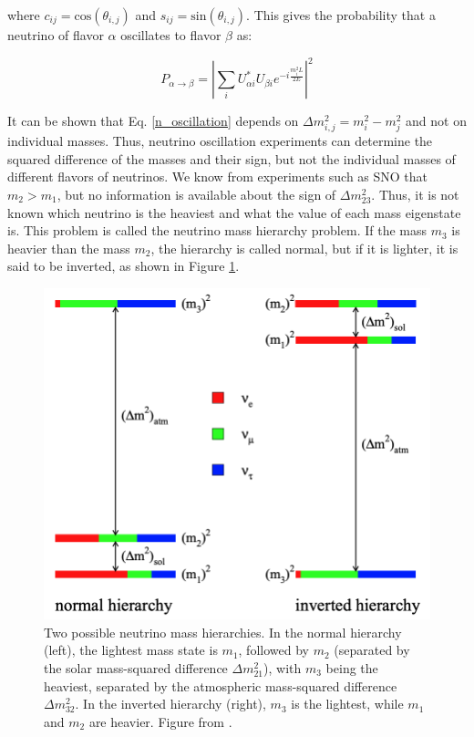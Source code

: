 where $c_{ij}=\mathrm{cos}(\theta_{i,j})$ and $s_{ij}=\mathrm{sin}(\theta_{i,j})$. This gives the probability that a neutrino of flavor $\alpha$ oscillates to flavor $\beta$ as:

\begin{equation}\label{n_oscillation}
P_{\alpha\rightarrow\beta} = \left|\sum_i U^*_{\alpha i}U_{\beta i} e^{-i\frac{m_i^2L}{2E}}\right|^2
\end{equation}

It can be shown that Eq. \ref{n_oscillation} depends on $\Delta m^2_{i,j}=m^2_i-m^2_j$ and not on individual masses. Thus, neutrino oscillation experiments can determine the squared difference of the masses and their sign, but not the individual masses of different flavors of neutrinos. We know from experiments such as SNO that $m_2>m_1$, but no information is available about the sign of $\Delta m_{23}^2$. Thus, it is not known which neutrino is the heaviest and what the value of each mass eigenstate is. This problem is called the neutrino mass hierarchy problem. If the mass $m_3$ is heavier than the mass $m_2$, the hierarchy is called normal, but if it is lighter, it is said to be inverted, as shown in Figure \ref{mass_hierarchies_fig}.

\begin{figure}[!htb]
\centering
\includegraphics[width=0.7\linewidth]{ch1/figs/mass_hierarchies.png}
\caption{Two possible neutrino mass hierarchies. In the normal hierarchy (left), the lightest mass state is \( m_1 \), followed by \( m_2 \) (separated by the solar mass-squared difference \( \Delta m^2_{21} \)), with \( m_3 \) being the heaviest, separated by the atmospheric mass-squared difference \( \Delta m^2_{32} \). In the inverted hierarchy (right), \( m_3 \) is the lightest, while \( m_1 \) and \( m_2 \) are heavier. Figure from \cite{Hewett:2012ns}.}
\label{mass_hierarchies_fig}
\end{figure}

